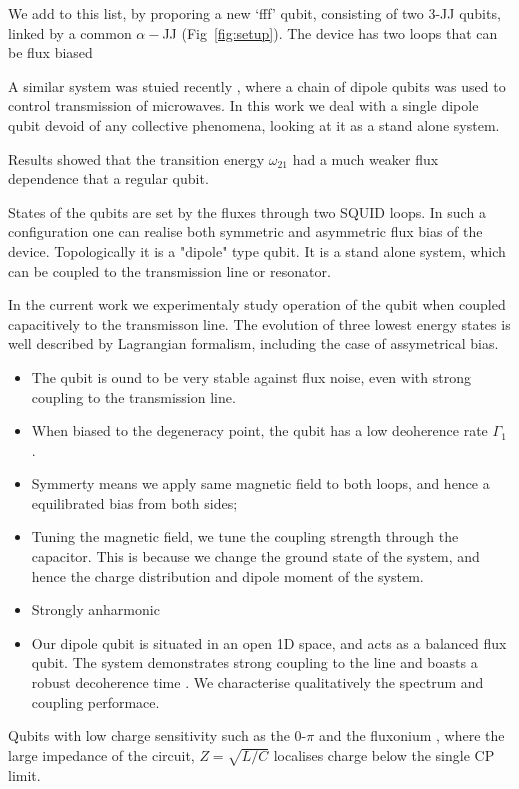  We add to this list, by proporing a new `fff' qubit, consisting of two 3-JJ qubits, linked by a common $ \alpha-$JJ (Fig~\ref{fig:setup}). The device has two loops that can be flux biased
 
  A similar system was stuied recently \cite{twin_flux_qubit}, where a chain of dipole qubits was used to control transmission of microwaves. In this work we deal with a single dipole qubit devoid of any collective phenomena, looking at it as a stand alone system.
 
 Results showed that the transition energy $ \omega_{21} $ had a much weaker flux dependence that a regular qubit.	
 
 States of the qubits are set by the fluxes through two SQUID loops. In such a configuration one can realise both symmetric and asymmetric flux bias of the device. Topologically it is a "dipole" type qubit. It is a stand alone system, which can be coupled to the transmission line or resonator. 

In the current work we experimentaly study operation of the qubit when coupled capacitively to the transmisson line.  The evolution of three lowest energy states is well described by Lagrangian formalism, including the case of assymetrical bias.   
 
\begin{itemize}
	\item The qubit is ound to be very stable against flux noise, even with strong coupling to the transmission line.
	\item When biased to the degeneracy point, the qubit has a low deoherence rate $ \Gamma_1 $ .
	\item Symmerty means we apply same magnetic field to both loops, and hence a equilibrated bias from both sides;
	\item Tuning the magnetic field, we tune the coupling strength through the capacitor. This is because we change the ground state of the system, and hence the charge distribution and dipole moment of the system. 
	\item Strongly anharmonic
	\item Our dipole qubit is situated in an open 1D space, and acts as a balanced flux qubit. The system demonstrates strong coupling to the line and boasts a robust decoherence time . We characterise qualitatively the spectrum and coupling performace.
\end{itemize}

 
 Qubits with low charge sensitivity such as the 0-$ \pi $ \cite{pi0_2006} and the fluxonium \cite{fluxonium_2009}, where the large impedance of the circuit, $ Z = \sqrt{L/C} $ localises charge below the single CP limit.
 
